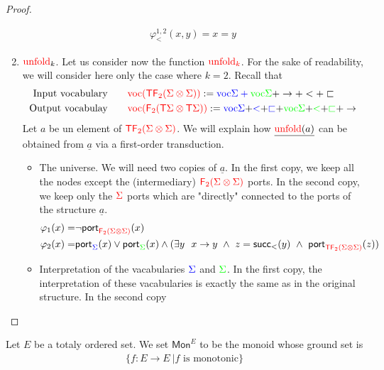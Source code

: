 \begin{proof}
\begin{enumerate}
\begin{align*}
\varphi_<^{1,2}(x,y)=x=y
\end{align*}
\item ${\color{red}{{\color{red}{\mathrm{unfold}}}}}_k$. Let us consider now the function   ${\color{red}{{\color{red}{\mathrm{unfold}}}_k}}$. For the sake of readability, we will consider here only the case where $k=2$.
Recall that 
\newcommand{\voc}[1]{\mathrm{voc}#1}
\begin{align*}
\text{Input vocabulary} \qquad& \ranked{\voctype(\tmonad  \reduce 2 (\Sigma \otimes \Sigma))} := \color{blue}{\voc \Sigma} + \color{green}{\voc \Sigma}  \color{black}{+ \rightarrow + < + \sqsubset}\\
\text{Output vocabulay} \qquad&
\ranked{\voctype(\reduce 2 (\tmonad\Sigma \otimes \tmonad  \Sigma))} := \color{blue}{\voc \Sigma} \color{black}{+} \color{blue}{<} \color{black}{+}\color{blue}{\sqsubset} \color{black}{+} \color{green}{\voc \Sigma} \color{black}{+} \color{green}{<} \color{black}{+}\color{green}{\sqsubset}  \color{black}{+ \rightarrow}
\end{align*} 
Let $a$ be un element of ${\color{red}{{\color{red}{\mathsf T}}{\color{red}{\mathsf F_{2}}}(\Sigma \otimes \Sigma)}}$. We will explain how
 $\underline{{\color{red}{\mathrm{unfold}}}(a)}$ can be obtained from $\underline{a}$ via a first-order transduction. 
\begin{itemize}
\item The universe.  We will need two copies of $\underline{a}$. 
In the first copy, we keep all the nodes except the (intermediary) ${\color{red}{{\color{red}{\mathsf F_{2}}}({\color{red}{\Sigma}}\otimes {\color{red}{\Sigma}})}}$ ports. In the second copy, we keep only the ${\color{red}{\Sigma}}$ ports which are "directly" connected to the ports of the structure $\underline{a}$.    
\begin{align*}
\varphi_1(x)=& \neg \mathsf{port}_{\ranked {\reduce 2 (\rSigma \otimes \rSigma)}}(x) \\
\varphi_2(x)= &\mathsf{port}_{\color{blue}{\Sigma}}(x) \vee \mathsf{port}_{\color{green}{\Sigma}}(x) \wedge ( \exists y\  \ x \rightarrow y\ \wedge\ z=\mathsf{succ_<}(y)\ \wedge\ \mathsf{port}_{\ranked{\tmonad \reduce 2 (\Sigma \otimes \Sigma)}}(z) )
\end{align*}
\item Interpretation of the vacabularies $\color{blue}{\Sigma}$ and $\color{green}{\Sigma}$. In the first copy, the interpretation of these vacabularies is exactly the same as in the original structure. In the second copy 
\end{itemize} 
 
\end{enumerate}
    
       \end{proof}
   Let $E$ be a totaly ordered set. We set $\mathsf{Mon}^E$ to be the monoid whose ground set is 
   \begin{align*}
   \{f:E\to E \ | f \text{ is monotonic}\}
\end{align*}    

